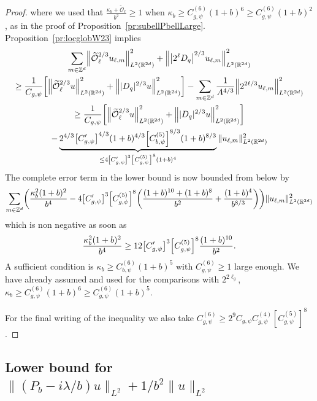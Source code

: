 \documentclass[10pt]{amsart}
\theoremstyle{definition}\newtheorem{defi}[theo]{Definition}\newtheorem{rema}[theo]{Remark}\newtheorem{exam}[theo]{Example}\newtheorem{exem}[theo]{Example}\newtheorem{nota}[theo]{Notation}
\newcommand{\Z}{\mathbb{Z}}
\newcommand{\R}{\mathbb{R}}
\newcommand{\clO}{\mathcal{O}}
\let\oldtilde\tilde
\renewcommand*{\tilde}[1]{\mathchoice{\widetilde{#1}}{\widetilde{#1}}{\oldtilde{#1}}{\oldtilde{#1}}}
\let\originalleft\left
\let\originalright\right
\renewcommand{\left}{\mathopen{}\mathclose\bgroup\originalleft}
\renewcommand{\right}{\aftergroup\egroup\originalright}
\begin{document}
\begin{proof}
\endgroup
where we used that $\frac{\kappa_{b}+\widetilde{\clO}_{\ell}}{b^{2}}\geq 1$ when $\kappa_{b}\geq C_{g,\psi}^{(6)}(1+b)^{6}\geq C_{g,\psi}^{(6)}(1+b)^{2}$, as in the proof of Proposition~\ref{pr:subellPbellLarge}. Proposition~\ref{pr:locglobW23} implies
\begin{multline*}
\sum_{m\in\Z^{d}}\left\|\tilde{\clO}_{\ell}^{2/3}u_{\ell,m}\right\|_{L^{2}(\R^{2d})}^{2}+
\left\|\left|2^{\ell}D_{q}\right|^{2/3}u_{\ell,m}\right\|_{L^{2}(\R^{2d})}^{2}
\\
\geq
\frac{1}{C_{g,\psi}}\left[
\left\|\tilde{\clO}_{\ell}^{2/3}u\right\|_{L^{2}(\R^{2d})}^{2}+
\left\||D_{q}|^{2/3}u\right\|_{L^{2}(\R^{2d})}^{2}
\right]-\sum_{m\in\Z^{d}}\frac{1}{A^{4/3}}
\left\|2^{2\ell/3}u_{\ell,m}\right\|_{L^{2}(\R^{2d})}^{2}
\\
\geq \frac{1}{C_{g,\psi}}\left[
\left\|\tilde{\clO}_{\ell}^{2/3}u\right\|_{L^{2}(\R^{2d})}^{2}+
\left\||D_{q}|^{2/3}u\right\|_{L^{2}(\R^{2d})}^{2}
\right]\\
-\underbrace{2^{4/3}\left[C_{g,\psi}'\right]^{4/3}(1+b)^{4/3}\left[C_{{b,\psi}}^{(5)}\right]^{8/3}(1+b)^{8/3}}_{\leq 4\left[C_{g,\psi}'\right]^{3}\left[C_{g,\psi}^{(5)}\right]^{8}(1+b)^{4}}\|u_{\ell,m}\|_{L^{2}(\R^{2d})}^{2}
\end{multline*}
The complete error term in the lower bound is now bounded from below by
\[
\sum_{m\in\Z^{d}}\left(\frac{\kappa_{b}^{2}(1+b)^{2}}{b^{4}}-4\left[C_{g,\psi}'\right]^{3}\left[C_{g,\psi}^{(5)}\right]^{8}\left(\frac{(1+b)^{10}+(1+b)^{8}}{b^{2}}+\frac{(1+b)^{4}}{b^{8/3}}\right)\right)
\|u_{\ell,m}\|_{L^{2}(\R^{2d})}^{2}
\]
which is non negative as soon as
\[
\frac{\kappa_{b}^2(1+b)^{2}}{b^{4}}\geq 12\left[C_{g,\psi}'\right]^{3}\left[C_{g,\psi}^{(5)}\right]^{8}\frac{(1+b)^{10}}{b^{2}}.
\]
A sufficient condition is $\kappa_{b}\geq C_{b,\psi}^{(6)}(1+b)^{5}$ with $C_{g,\psi}^{(6)}\geq 1$ large enough. We have already assumed and used for the comparisons with $2^{2\ell_{g}}$, $\kappa_{b}\geq C_{g,\psi}^{(6)}(1+b)^{6}\geq C_{g,\psi}^{(6)}(1+b)^{5}$.

For the final writing of the inequality we also take $C_{g,\psi}^{(6)}\geq 2^{9}C_{g,\psi}C_{g,\psi}^{(4)}[C_{g,\psi}^{(5)}]^{8}$.
\end{proof}

\subsection{Lower bound for \texorpdfstring{$\|(P_b-i\lambda/b)u\|_{L^2}+1/b^2\|u\|_{L^2}$}{|(P\_b-i lambda/b)u |\_L\^2+1/b\^2 |u |\_L\^2}}\label{sec:totallower}
\end{document}
